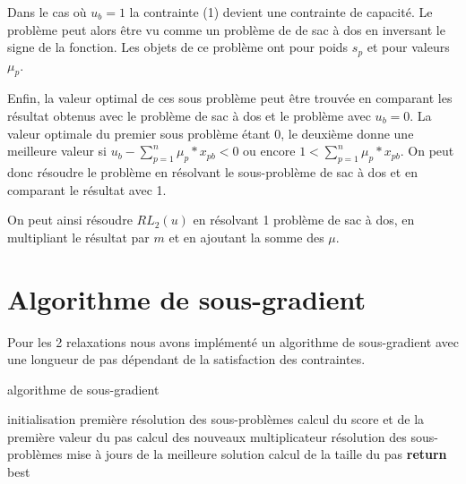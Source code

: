 \documentclass{article}
\begin{document}
Dans le cas où $u_b = 1$ la contrainte (1) devient une contrainte de capacité.
Le problème peut alors être vu comme un problème de de sac à dos en inversant le signe de la fonction.
Les objets de ce problème ont pour poids $s_p$ et pour valeurs $\mu_p$. \newline

Enfin, la valeur optimal de ces sous problème peut être trouvée en comparant les résultat obtenus avec le problème de sac à dos et le problème avec $u_b = 0$.
La valeur optimale du premier sous problème étant $0$, le deuxième donne une meilleure valeur si $u_b - \sum_{p=1}^n \mu_p*x_{pb} < 0$ ou encore $1 < \sum_{p=1}^n \mu_p*x_{pb}$.
On peut donc résoudre le problème en résolvant le sous-problème de sac à dos et en comparant le résultat avec 1.\newline

On peut ainsi résoudre $RL_2(u)$ en résolvant 1 problème de sac à dos, en multipliant le résultat par $m$ et en ajoutant la somme des $\mu$.

\section{Algorithme de sous-gradient}

Pour les 2 relaxations nous avons implémenté un algorithme de sous-gradient avec une longueur de pas dépendant de la satisfaction des contraintes.

\begin{algorithm}
\caption{algorithme de sous-gradient}
\begin{algorithmic}[1]
	\State initialisation
	\State première résolution des sous-problèmes
	\State calcul du score et de la première valeur du pas
		\State calcul des nouveaux multiplicateur
		\State résolution des sous-problèmes
		\State mise à jours de la meilleure solution
		\State calcul de la taille du pas
	\EndWhile
	\State \textbf{return} best
\EndFunction
\end{algorithmic}
\end{algorithm}
\end{document}
